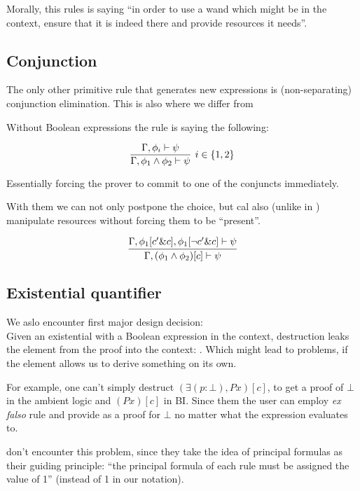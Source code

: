 Morally, this rules is saying ``in order to use a wand which might be in the context, ensure that it is indeed there and provide resources it needs''.

\subsection{Conjunction}

The only other primitive rule that generates new expressions is (non-separating) conjunction elimination.
This is also where we differ from \citet{harlandResourceDistributionBooleanConstraints2003}

Without Boolean expressions the rule is saying the following:

\[
\infer[ i \in \{1,2\} ]
      {\Gamma, \phi_1 \wedge \phi_2 \vdash \psi}
      {\Gamma, \phi_i \vdash \psi}
\]

Essentially forcing the prover to commit to one of the conjuncts immediately.

With them we can not only postpone the choice, but cal also (unlike in \cite{harlandResourceDistributionBooleanConstraints2003}) manipulate resources without forcing them to be ``present''.

\[
\infer{\Gamma, (\phi_1 \wedge \phi_2)[c] \vdash \psi}
      {\Gamma, \phi_1[c' \& c], \phi_1[\neg c' \& c] \vdash \psi}
\]

\subsection{Existential quantifier}

We aslo encounter first major design decision:\\
Given an existential with a Boolean expression in the context, destruction leaks the element from the proof into the context: .
Which might lead to problems, if the element allows us to derive something on its own.

For example, one can't simply destruct \((\exists (p : \bot), P x)[c]\), to get a proof of \(\bot\) in the ambient logic and \((P x)[c]\) in BI\@.
Since them the user can employ \emph{ex falso} rule and provide  as a proof for \(\bot\) no matter what the expression evaluates to.

\citet[page 5]{harlandResourceDistributionBooleanConstraints2003} don't encounter this problem, since they take the idea of principal formulas as their guiding principle: ``the principal formula of each rule must be assigned the value of 1'' (\true instead of 1 in our notation).

